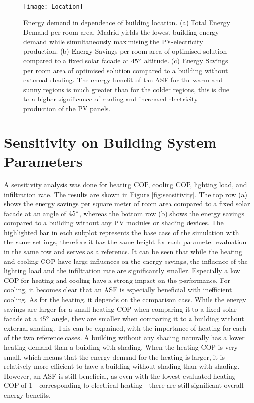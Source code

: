 	\begin{figure*}
		\begin{center}
		\texttt{[image: Location]}
		\caption{Energy demand in dependence of building location. (a) Total Energy Demand per room area, Madrid yields the lowest building energy demand while simultaneously maximising the PV-electricity production. (b) Energy Savings per room area of optimised solution compared to a fixed solar facade at $45\degree$ altitude. (c) Energy Savings per room area of optimised solution compared to a building without external shading. The energy benefit of the ASF for the warm and sunny regions is much greater than for the colder regions, this is due to a higher significance of cooling and increased electricity production of the PV panels.}
		\label{fig:buildingLocation}
		\end{center}
	\end{figure*}
\section{Sensitivity on Building System Parameters}

	A sensitivity analysis was done for heating COP, cooling COP, lighting load, and infiltration rate. The results are shown in Figure \ref{fig:sensitivity}. The top row (a) shows the energy savings per square meter of room area compared to a fixed solar facade at an angle of $45\degree$, whereas the bottom row (b) shows the energy savings compared to a building without any PV modules or shading devices. The highlighted bar in each subplot represents the base case of the simulation with the same settings, therefore it has the same height for each parameter evaluation in the same row and serves as a reference. It can be seen that while the heating and cooling COP have large influences on the energy savings, the influence of the lighting load and the infiltration rate are significantly smaller. Especially a low COP for heating and cooling have a strong impact on the performance. For cooling, it becomes clear that an ASF is especially beneficial with inefficient cooling. As for the heating, it depends on the comparison case. While the energy savings are larger for a small heating COP when comparing it to a fixed solar facade at a $45\degree$ angle, they are smaller when comparing it to a building without external shading. This can be explained, with the importance of heating for each of the two reference cases. A building without any shading naturally has a lower heating demand than a building with shading. When the heating COP is very small, which means that the energy demand for the heating is larger, it is relatively more efficient to have a building without shading than with shading. However, an ASF is still beneficial, as even with the lowest evaluated heating COP of 1 - corresponding to electrical heating - there are still significant overall energy benefits. 

